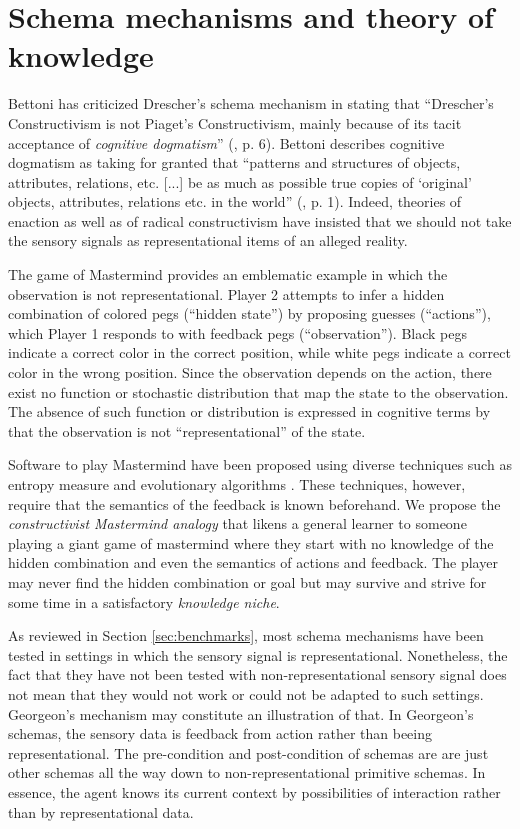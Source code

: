 \documentclass[runningheads]{llncs}
\begin{document}
\section{Schema mechanisms and theory of knowledge}

Bettoni  has criticized Drescher's schema mechanism in stating that ``Drescher's Constructivism is not Piaget's Constructivism, mainly because of its tacit acceptance of \textit{cognitive dogmatism}'' (\cite{bettoni_made-up_1993}, p. 6).
Bettoni describes cognitive dogmatism as taking for granted that ``patterns and structures of objects, attributes, relations, etc. [...] be as much as possible true copies of `original' objects, attributes, relations etc. in the world'' (\cite{bettoni_made-up_1993}, p. 1).
Indeed, theories of enaction as well as of radical constructivism have insisted that we should not take the sensory signals as representational items of an alleged reality. 


The game of Mastermind provides an emblematic example in which the observation is not representational. 
Player 2 attempts to infer a hidden combination of colored pegs (``hidden state'') by proposing guesses (``actions''), which Player 1 responds to with feedback pegs (``observation''). Black pegs indicate a correct color in the correct position, while white pegs indicate a correct color in the wrong position.
Since the observation depends on the action, there exist no function or stochastic distribution that map the state to the observation. 
The absence of such function or distribution is expressed in cognitive terms by that the observation is not ``representational'' of the state.

Software to play Mastermind have been proposed using diverse techniques such as entropy measure and evolutionary algorithms \cite{cotta_entropy-driven_2010}.
These techniques, however, require that the semantics of the feedback is known beforehand. 
We propose the \textit{constructivist Mastermind analogy} that likens a general learner to someone playing a giant game of mastermind where they start with no knowledge of the hidden combination and even the semantics of actions and feedback.
The player may never find the hidden combination or goal but may survive and strive for some time in a satisfactory \textit{knowledge niche}.

As reviewed in Section \ref{sec:benchmarks}, most schema mechanisms have been tested in settings in which the sensory signal is representational.
Nonetheless, the fact that they have not been tested with non-representational sensory signal does not mean that they would not work or could not be adapted to such settings. 
Georgeon's mechanism may constitute an illustration of that.  
In Georgeon's schemas, the sensory data is feedback from action rather than beeing representational. 
The pre-condition and post-condition of schemas are are just other schemas all the way down to non-representational primitive schemas. 
In essence, the agent knows its current context by possibilities of interaction rather than by representational data. 
\end{document}
